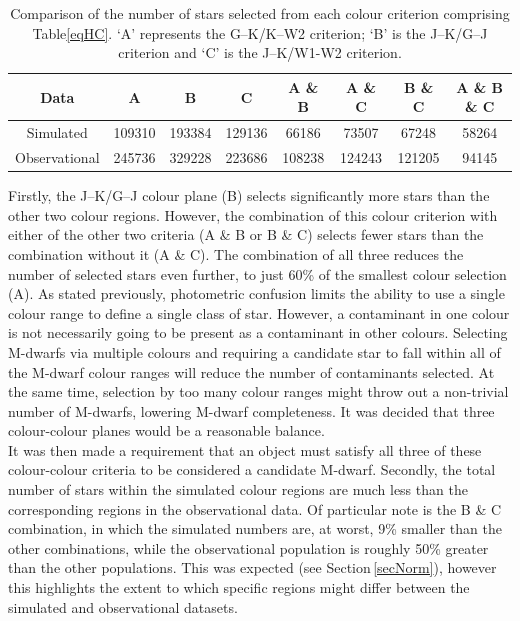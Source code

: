\begin{table}
\begin{center}
	\begin{tabular}{| c | c | c | c || c | c | c || c |}
		\hline
        Data & A & B & C & A \& B & A \& C & B \& C & A \& B \& C\\
        \hline
        Simulated & 109310 & 193384 & 129136 & 66186 & 73507 & 67248 & 58264 \\
        Observational & 245736 & 329228 & 223686 & 108238 & 124243 & 121205 & 94145 \\
        \hline
\end{tabular}
\caption{Comparison of the number of stars selected from each colour criterion comprising Table\ref{eqHC}. `A' represents the G--K/K--W2 criterion; `B' is the J--K/G--J criterion and `C' is the J--K/W1-W2 criterion.}
\label{TabColSelect}
\end{center}
\end{table}
Firstly, the J--K/G--J colour plane (B) selects significantly more stars than the other two colour regions. However, the combination of this colour criterion with either of the other two criteria (A \& B or B \& C) selects fewer stars than the combination without it (A \& C). The combination of all three reduces the number of selected stars even further, to just 60\% of the smallest colour selection (A). As stated previously, photometric confusion limits the ability to use a single colour range to define a single class of star. However, a contaminant in one colour is not necessarily going to be present as a contaminant in other colours. Selecting M-dwarfs via multiple colours and requiring a candidate star to fall within all of the M-dwarf colour ranges will reduce the number of contaminants selected. At the same time, selection by too many colour ranges might throw out a non-trivial number of M-dwarfs, lowering M-dwarf completeness. It was decided that three colour-colour planes would be a reasonable balance.\\

It was then made a requirement that an object must satisfy all three of these colour-colour criteria to be considered a candidate M-dwarf. Secondly, the total number of stars within the simulated colour regions are much less than the corresponding regions in the observational data. Of particular note is the B \& C combination, in which the simulated numbers are, at worst, 9\% smaller than the other combinations, while the observational population is roughly 50\% greater than the other populations. This was expected (see Section\,\ref{secNorm}), however this highlights the extent to which specific regions might differ between the simulated and observational datasets.\\

